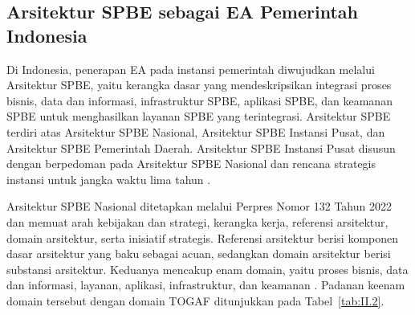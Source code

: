\subsection{Arsitektur SPBE sebagai EA Pemerintah Indonesia}
\label{sec:II.3.3}

Di Indonesia, penerapan EA pada instansi pemerintah diwujudkan melalui Arsitektur SPBE, yaitu kerangka dasar yang mendeskripsikan integrasi proses bisnis, data dan informasi, infrastruktur SPBE, aplikasi SPBE, dan keamanan SPBE untuk menghasilkan layanan SPBE yang terintegrasi. Arsitektur SPBE terdiri atas Arsitektur SPBE Nasional, Arsitektur SPBE Instansi Pusat, dan Arsitektur SPBE Pemerintah Daerah. Arsitektur SPBE Instansi Pusat disusun dengan berpedoman pada Arsitektur SPBE Nasional dan rencana strategis instansi untuk jangka waktu lima tahun \cite{Perpres95Tahun2018}.

Arsitektur SPBE Nasional ditetapkan melalui Perpres Nomor 132 Tahun 2022 dan memuat arah kebijakan dan strategi, kerangka kerja, referensi arsitektur, domain arsitektur, serta inisiatif strategis. Referensi arsitektur berisi komponen dasar arsitektur yang baku sebagai acuan, sedangkan domain arsitektur berisi substansi arsitektur. Keduanya mencakup enam domain, yaitu proses bisnis, data dan informasi, layanan, aplikasi, infrastruktur, dan keamanan \cite{Perpres132Tahun2022}. Padanan keenam domain tersebut dengan domain TOGAF ditunjukkan pada Tabel~\ref{tab:II.2}.

